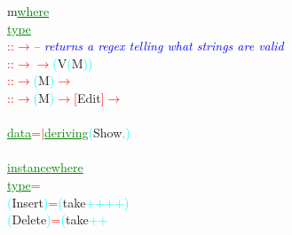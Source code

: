 {\rm{}m}\hsspace \textcolor{green}{\underline{where}}\\\hstab \textcolor{green}{\underline{type}}\\\hsspace \hsspace \textcolor{red}{::}\hsspace \textcolor{red}{\ensuremath{\rightarrow}}\hsspace \textcolor{blue}{{\it{}-- returns a regex telling what strings are valid}}\\\hsspace \hsspace \textcolor{red}{::}\hsspace \textcolor{red}{\ensuremath{\rightarrow}}\hsspace \textcolor{red}{\ensuremath{\rightarrow}}\hsspace \textcolor{cyan}{(}{\rm{}V}\hsspace \textcolor{cyan}{(}{\rm{}M}\textcolor{cyan}{)}\textcolor{cyan}{)}\\\hsspace \textcolor{red}{::}\hsspace \textcolor{red}{\ensuremath{\rightarrow}}\hsspace \textcolor{cyan}{(}{\rm{}M}\textcolor{cyan}{)}\hsspace \textcolor{red}{\ensuremath{\rightarrow}}\\\hsspace \hsspace \hsspace \textcolor{red}{::}\hsspace \textcolor{red}{\ensuremath{\rightarrow}}\hsspace \textcolor{cyan}{(}{\rm{}M}\textcolor{cyan}{)}\hsspace \textcolor{red}{\ensuremath{\rightarrow}}\hsspace \textcolor{red}{[}{\rm{}Edit}\textcolor{red}{]}\hsspace \textcolor{red}{\ensuremath{\rightarrow}}\\\\\textcolor{green}{\underline{data}}\hsspace \textcolor{red}{=}\hsspace \textcolor{red}{\ensuremath{|}}\hsspace \textcolor{green}{\underline{deriving}}\hsspace \textcolor{cyan}{(}{\rm{}Show}\textcolor{cyan}{,}\textcolor{cyan}{)}\\\\\textcolor{green}{\underline{instance}}\hsspace \textcolor{green}{\underline{where}}\\\hstab \textcolor{green}{\underline{type}}\hsspace \textcolor{red}{=}\\\hsspace \textcolor{cyan}{(}{\rm{}Insert}\textcolor{cyan}{)}\hsspace \textcolor{red}{=}\hsspace \textcolor{cyan}{(}{\rm{}take}\hsspace \textcolor{cyan}{++}\hsspace \textcolor{cyan}{++}\textcolor{cyan}{)}\\\hsspace \textcolor{cyan}{(}{\rm{}Delete}\textcolor{cyan}{)}\hsspace \textcolor{red}{=}\hsspace \textcolor{cyan}{(}{\rm{}take}\hsspace \textcolor{cyan}{++}\hsspace 